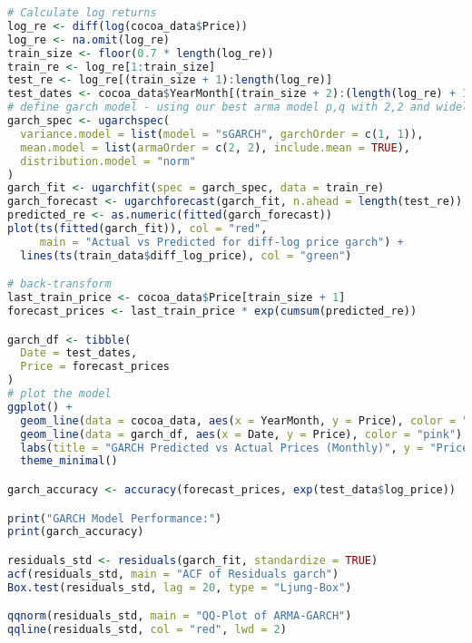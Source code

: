 \documentclass[10pt]{article}
\begin{document}
\begin{lstlisting}[language=R, caption=GARCH]
# Calculate log returns
log_re <- diff(log(cocoa_data$Price))
log_re <- na.omit(log_re)
train_size <- floor(0.7 * length(log_re))
train_re <- log_re[1:train_size]
test_re <- log_re[(train_size + 1):length(log_re)]
test_dates <- cocoa_data$YearMonth[(train_size + 2):(length(log_re) + 1)]
# define garch model - using our best arma model p,q with 2,2 and widely used garchorder 1,1
garch_spec <- ugarchspec(
  variance.model = list(model = "sGARCH", garchOrder = c(1, 1)),
  mean.model = list(armaOrder = c(2, 2), include.mean = TRUE),
  distribution.model = "norm"
)
garch_fit <- ugarchfit(spec = garch_spec, data = train_re)
garch_forecast <- ugarchforecast(garch_fit, n.ahead = length(test_re))
predicted_re <- as.numeric(fitted(garch_forecast))
plot(ts(fitted(garch_fit)), col = "red", 
     main = "Actual vs Predicted for diff-log price garch") +
  lines(ts(train_data$diff_log_price), col = "green")

# back-transform
last_train_price <- cocoa_data$Price[train_size + 1]
forecast_prices <- last_train_price * exp(cumsum(predicted_re))

garch_df <- tibble(
  Date = test_dates,
  Price = forecast_prices
)
# plot the model
ggplot() +
  geom_line(data = cocoa_data, aes(x = YearMonth, y = Price), color = "black") +
  geom_line(data = garch_df, aes(x = Date, y = Price), color = "pink") +
  labs(title = "GARCH Predicted vs Actual Prices (Monthly)", y = "Price", x = "Date") +
  theme_minimal()

garch_accuracy <- accuracy(forecast_prices, exp(test_data$log_price))

print("GARCH Model Performance:")
print(garch_accuracy)

residuals_std <- residuals(garch_fit, standardize = TRUE)
acf(residuals_std, main = "ACF of Residuals garch")
Box.test(residuals_std, lag = 20, type = "Ljung-Box")

qqnorm(residuals_std, main = "QQ-Plot of ARMA-GARCH")
qqline(residuals_std, col = "red", lwd = 2)
\end{lstlisting}
\end{document}
